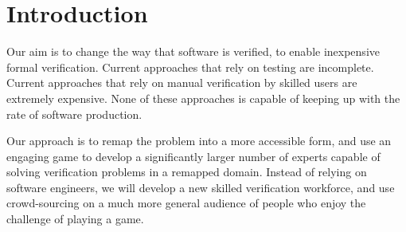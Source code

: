 \documentclass{sig-alternate}
\begin{document}

\section{Introduction}

Our aim is to change the way that software is verified, to enable
inexpensive formal verification.  Current approaches that rely on
testing are incomplete.  Current approaches that rely on manual
verification by skilled users are extremely expensive.  
None of these approaches is capable of keeping up with the
rate of software production.

Our approach is to remap the problem into a more accessible
form, and use an engaging game to develop a significantly larger
number of experts capable of solving verification problems in a
remapped domain.  Instead of relying on software engineers, we will
develop a new skilled verification workforce, and use crowd-sourcing
on a much more general audience of people who enjoy the challenge of
playing a game.
\end{document}
